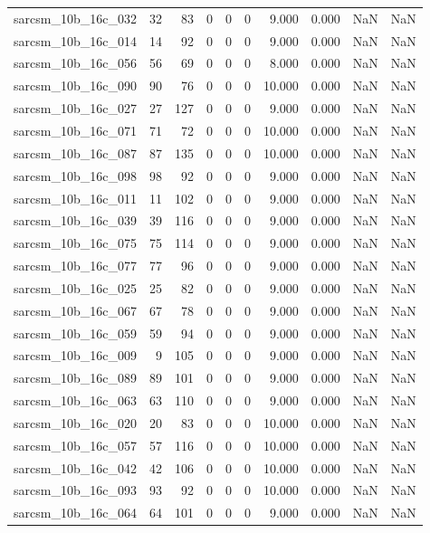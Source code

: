 \documentclass{article}
\begin{document}
\begin{longtable}{lrrrrrrrrr}
sarcsm\_10b\_16c\_032 & 32 & 83 & 0 & 0 & 0 & 9.000 & 0.000 & NaN & NaN \\
sarcsm\_10b\_16c\_014 & 14 & 92 & 0 & 0 & 0 & 9.000 & 0.000 & NaN & NaN \\
sarcsm\_10b\_16c\_056 & 56 & 69 & 0 & 0 & 0 & 8.000 & 0.000 & NaN & NaN \\
sarcsm\_10b\_16c\_090 & 90 & 76 & 0 & 0 & 0 & 10.000 & 0.000 & NaN & NaN \\
sarcsm\_10b\_16c\_027 & 27 & 127 & 0 & 0 & 0 & 9.000 & 0.000 & NaN & NaN \\
sarcsm\_10b\_16c\_071 & 71 & 72 & 0 & 0 & 0 & 10.000 & 0.000 & NaN & NaN \\
sarcsm\_10b\_16c\_087 & 87 & 135 & 0 & 0 & 0 & 10.000 & 0.000 & NaN & NaN \\
sarcsm\_10b\_16c\_098 & 98 & 92 & 0 & 0 & 0 & 9.000 & 0.000 & NaN & NaN \\
sarcsm\_10b\_16c\_011 & 11 & 102 & 0 & 0 & 0 & 9.000 & 0.000 & NaN & NaN \\
sarcsm\_10b\_16c\_039 & 39 & 116 & 0 & 0 & 0 & 9.000 & 0.000 & NaN & NaN \\
sarcsm\_10b\_16c\_075 & 75 & 114 & 0 & 0 & 0 & 9.000 & 0.000 & NaN & NaN \\
sarcsm\_10b\_16c\_077 & 77 & 96 & 0 & 0 & 0 & 9.000 & 0.000 & NaN & NaN \\
sarcsm\_10b\_16c\_025 & 25 & 82 & 0 & 0 & 0 & 9.000 & 0.000 & NaN & NaN \\
sarcsm\_10b\_16c\_067 & 67 & 78 & 0 & 0 & 0 & 9.000 & 0.000 & NaN & NaN \\
sarcsm\_10b\_16c\_059 & 59 & 94 & 0 & 0 & 0 & 9.000 & 0.000 & NaN & NaN \\
sarcsm\_10b\_16c\_009 & 9 & 105 & 0 & 0 & 0 & 9.000 & 0.000 & NaN & NaN \\
sarcsm\_10b\_16c\_089 & 89 & 101 & 0 & 0 & 0 & 9.000 & 0.000 & NaN & NaN \\
sarcsm\_10b\_16c\_063 & 63 & 110 & 0 & 0 & 0 & 9.000 & 0.000 & NaN & NaN \\
sarcsm\_10b\_16c\_020 & 20 & 83 & 0 & 0 & 0 & 10.000 & 0.000 & NaN & NaN \\
sarcsm\_10b\_16c\_057 & 57 & 116 & 0 & 0 & 0 & 10.000 & 0.000 & NaN & NaN \\
sarcsm\_10b\_16c\_042 & 42 & 106 & 0 & 0 & 0 & 10.000 & 0.000 & NaN & NaN \\
sarcsm\_10b\_16c\_093 & 93 & 92 & 0 & 0 & 0 & 10.000 & 0.000 & NaN & NaN \\
sarcsm\_10b\_16c\_064 & 64 & 101 & 0 & 0 & 0 & 9.000 & 0.000 & NaN & NaN \\

\end{longtable}
\end{document}
